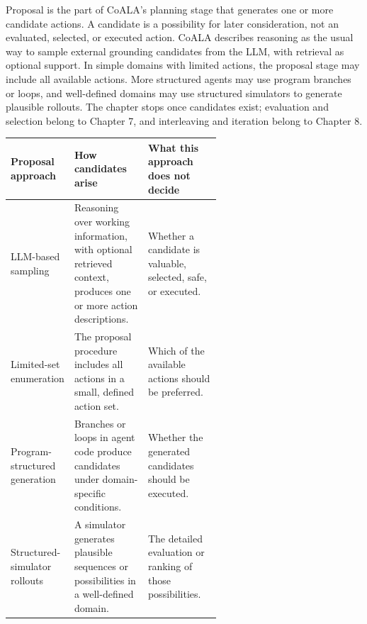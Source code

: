 \begin{chapterrecap}
Proposal is the part of CoALA's planning stage that generates one or more candidate actions. A candidate is a possibility for later consideration, not an evaluated, selected, or executed action. CoALA describes reasoning as the usual way to sample external grounding candidates from the LLM, with retrieval as optional support. In simple domains with limited actions, the proposal stage may include all available actions. More structured agents may use program branches or loops, and well-defined domains may use structured simulators to generate plausible rollouts. The chapter stops once candidates exist; evaluation and selection belong to Chapter 7, and interleaving and iteration belong to Chapter 8.
\end{chapterrecap}

\begin{center}
\begin{tabularx}{\linewidth}{@{}P{0.24\linewidth}P{0.35\linewidth}X@{}}
\toprule
\textbf{Proposal approach} & \textbf{How candidates arise} & \textbf{What this approach does not decide} \\
\midrule
LLM-based sampling & Reasoning over working information, with optional retrieved context, produces one or more action descriptions. & Whether a candidate is valuable, selected, safe, or executed. \\
Limited-set enumeration & The proposal procedure includes all actions in a small, defined action set. & Which of the available actions should be preferred. \\
Program-structured generation & Branches or loops in agent code produce candidates under domain-specific conditions. & Whether the generated candidates should be executed. \\
Structured-simulator rollouts & A simulator generates plausible sequences or possibilities in a well-defined domain. & The detailed evaluation or ranking of those possibilities. \\
\bottomrule
\end{tabularx}
\end{center}

